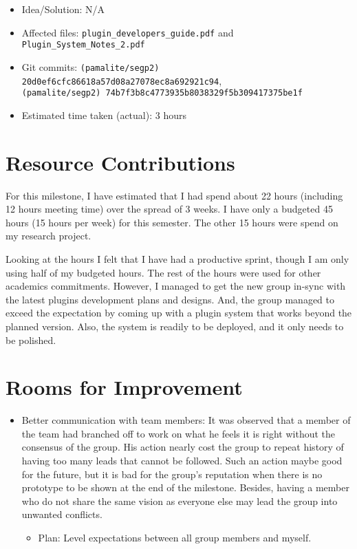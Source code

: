 \documentclass{article}
\begin{document}
\begin{itemize}
\begin{itemize}
	         \item Idea/Solution: N/A
	         \item Affected files: \texttt{plugin\_developers\_guide.pdf} and \texttt{Plugin\_System\_Notes\_2.pdf}
	         \item Git commits: \texttt{(pamalite/segp2) 20d0ef6cfc86618a57d08a27078ec8a692921c94}, \\\texttt{(pamalite/segp2) 74b7f3b8c4773935b8038329f5b309417375be1f}
	         \item Estimated time taken (actual): 3 hours
	     \end{itemize}
\end{itemize}

\section*{Resource Contributions}

For this milestone, I have estimated that I had spend about 22 hours (including 12 hours meeting time) over the spread of 3 weeks. I have only a budgeted 45 hours (15 hours per week) for this semester. The other 15 hours were spend on my research project. 

Looking at the hours I felt that I have had a productive sprint, though I am only using half of my budgeted hours. The rest of the hours were used for other academics commitments. However, I managed to get the new group in-sync with the latest plugins development plans and designs. And, the group managed to exceed the expectation by coming up with a plugin system that works beyond the planned version. Also, the system is readily to be deployed, and it only needs to be polished.  

\section*{Rooms for Improvement}

\begin{itemize}
   \item Better communication with team members: It was observed that a member of the team had branched off to work on what he feels it is right without the consensus of the group. His action nearly cost the group to repeat history of having too many leads that cannot be followed. Such an action maybe good for the future, but it is bad for the group's reputation when there is no prototype to be shown at the end of the milestone. Besides, having a member who do not share the same vision as everyone else may lead the group into unwanted conflicts. 
      \begin{itemize}
         \item Plan: Level expectations between all group members and myself.
      \end{itemize}
\end{itemize}
\end{document}
